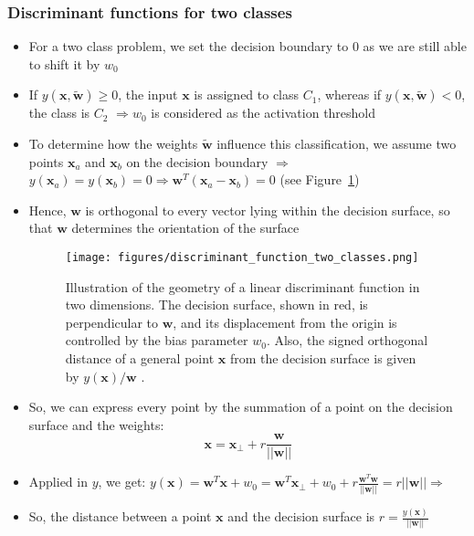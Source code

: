 \subsubsection{Discriminant functions for two classes}
\begin{itemize}
	\item For a two class problem, we set the decision boundary to 0 as we are still able to shift it by $w_0$
	\item If $y\left(\bm{x},\bm{\tilde{w}}\right)\geq 0$, the input $\bm{x}$ is assigned to class $C_1$, whereas if $y\left(\bm{x},\bm{\tilde{w}}\right)< 0$, the class is $C_2$ $\Rightarrow w_0$ is considered as the activation threshold
	\item To determine how the weights $\bm{\tilde{w}}$ influence this classification, we assume two points $\bm{x}_a$ and $\bm{x}_b$ on the decision boundary $\Rightarrow$ $y\left(\bm{x}_a\right) = y\left(\bm{x}_b\right) = 0 \Rightarrow \bm{w}^T(\bm{x}_a - \bm{x}_b) = 0$ (see Figure~\ref{img:discriminant_function_two_classes})
	\item Hence, $\bm{w}$ is orthogonal to every vector lying within the decision surface, so that $\bm{w}$ determines the orientation of the surface
	\begin{figure}[ht]
		\centering
		\texttt{[image: figures/discriminant\_function\_two\_classes.png]}
		\caption{Illustration of the geometry of a linear discriminant function in two dimensions. The decision surface, shown in red, is perpendicular to $\bm{w}$, and its displacement from the origin is controlled by the bias parameter $w_0$. Also, the signed orthogonal distance of a general point $\bm{x}$ from the decision surface is given by $y(\bm{x})/ \bm{w}$ .}
		\label{img:discriminant_function_two_classes}
	\end{figure}
	\item So, we can express every point by the summation of a point on the decision surface and the weights: $$\bm{x} = \bm{x}_{\perp} + r\frac{\bm{w}}{||\bm{w}||}$$
	\item Applied in $y$, we get: $y\left(\bm{x}\right) = \bm{w}^T \bm{x} + w_0 = \bm{w}^T \bm{x}_{\perp} + w_0 + r\frac{\bm{w}^T\bm{w}}{||\bm{w}||} = r ||\bm{w}|| \Rightarrow $
	\item So, the distance between a point $\bm{x}$ and the decision surface is $r = \frac{y\left(\bm{x}\right)}{||\bm{w}||}$
\end{itemize}
